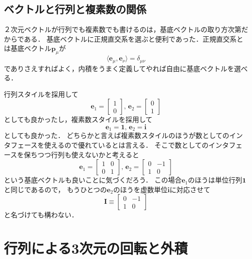 \documentclass{jsbook}
\newcommand{\one}{\mathbf{1}}
\newcommand{\One}{\mathbf{1}}
\newcommand{\im}{\mathbf{i}}
\newcommand{\I}{\mathbf{I}}
\newcommand{\bvec}[1]{\boldsymbol{#1}}
\begin{document}
\subsection{ベクトルと行列と複素数の関係}

２次元ベクトルが行列でも複素数でも書けるのは，基底ベクトルの取り方次第だからである．
基底ベクトルに正規直交系を選ぶと便利であった．正規直交系とは基底ベクトル$\bvec{p}_\mu$が
\begin{equation}
\langle\bvec{e}_\mu,\bvec{e}_\nu\rangle=\delta_{\mu\nu}
\end{equation}
でありさえすればよく，内積をうまく定義してやれば自由に基底ベクトルを選べる．

行列スタイルを採用して
\begin{equation}
\bvec{e}_1=\begin{bmatrix}1\\0\end{bmatrix},\,
\bvec{e}_2=\begin{bmatrix}0\\1\end{bmatrix}
\end{equation}
としても良かったし，複素数スタイルを採用して
\begin{equation}
\bvec{e}_1=\one,\,
\bvec{e}_2=\im
\end{equation}
としても良かった．
どちらかと言えば複素数スタイルのほうが数としてのインタフェースを使えるので優れているとは言える．
そこで数としてのインタフェースを保ちつつ行列も使えないかと考えると
\begin{equation}
\bvec{e}_1=\begin{bmatrix}1&0\\0&1\end{bmatrix},\,
\bvec{e}_2=\begin{bmatrix}0&-1\\1&0\end{bmatrix}
\end{equation}
という基底ベクトルも良いことに気づくだろう．
この場合$\bvec{e}_1$のほうは単位行列$\One$と同じであるので，
もうひとつの$\bvec{e}_2$のほうを虚数単位$\im$に対応させて
\begin{equation}
\I\equiv\begin{bmatrix}0&-1\\1&0\end{bmatrix}
\end{equation}
と名づけても構わない．
%
%

\section{行列による3次元の回転と外積}
\end{document}
